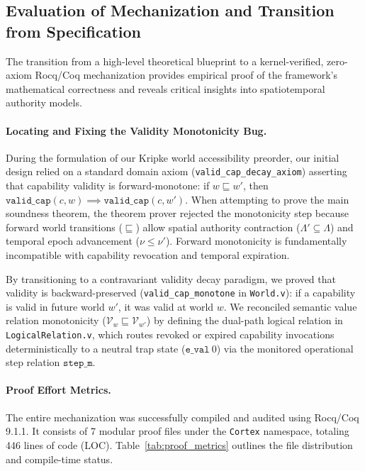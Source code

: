 \subsection{Evaluation of Mechanization and Transition from Specification}
\label{subsec:evaluation_transition}

The transition from a high-level theoretical blueprint to a kernel-verified, zero-axiom Rocq/Coq mechanization provides empirical proof of the framework's mathematical correctness and reveals critical insights into spatiotemporal authority models. 

\paragraph{Locating and Fixing the Validity Monotonicity Bug.}
During the formulation of our Kripke world accessibility preorder, our initial design relied on a standard domain axiom (\texttt{valid\_cap\_decay\_axiom}) asserting that capability validity is forward-monotone: if $w \sqsubseteq w'$, then $\mathtt{valid\_cap}(c, w) \implies \mathtt{valid\_cap}(c, w')$. When attempting to prove the main soundness theorem, the theorem prover rejected the monotonicity step because forward world transitions ($\sqsubseteq$) allow spatial authority contraction ($\Lambda' \subseteq \Lambda$) and temporal epoch advancement ($\nu \le \nu'$). Forward monotonicity is fundamentally incompatible with capability revocation and temporal expiration. 

By transitioning to a contravariant validity decay paradigm, we proved that validity is backward-preserved (\texttt{valid\_cap\_monotone} in \texttt{World.v}): if a capability is valid in future world $w'$, it was valid at world $w$. 
We reconciled semantic value relation monotonicity ($\mathcal{V}_w \sqsubseteq \mathcal{V}_{w'}$) by defining the dual-path logical relation in \texttt{LogicalRelation.v}, which routes revoked or expired capability invocations deterministically to a neutral trap state ($\mathtt{e\_val}~0$) via the monitored operational step relation $\mathtt{step\_m}$.

\paragraph{Proof Effort Metrics.}
The entire mechanization was successfully compiled and audited using Rocq/Coq 9.1.1. It consists of 7 modular proof files under the \texttt{Cortex} namespace, totaling 446 lines of code (LOC). Table~\ref{tab:proof_metrics} outlines the file distribution and compile-time status.

